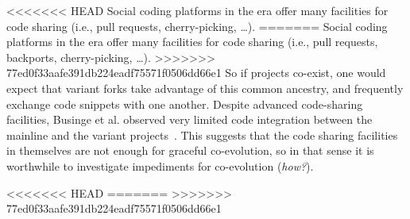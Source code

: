 <<<<<<< HEAD
Social coding platforms in the \gh era offer many facilities for code sharing (i.e., pull requests, cherry-picking, \ldots).
=======
Social coding platforms in the \gh era offer many facilities for code sharing (i.e., pull requests, backports, cherry-picking, \ldots).
>>>>>>> 77ed0f33aafe391db224eadf75571f0506dd66e1
So if projects co-exist, one would expect that variant forks take advantage of this common ancestry, and frequently exchange code snippets with one another.
Despite advanced code-sharing facilities, Businge et al. observed very limited code integration between the mainline and the variant projects~\cite{businge:emse:2021}.
This suggests that the code sharing facilities in themselves are not enough for graceful co-evolution, so in that sense it is worthwhile to investigate impediments for co-evolution (\textit{how?}).

<<<<<<< HEAD
=======
>>>>>>> 77ed0f33aafe391db224eadf75571f0506dd66e1

\newcommand*{\RQOne} [1] {Why do developers create and maintain variants on \gh?}
\newcommand*{\RQTwo} [1] {How do variant projects evolve with respect to the mainline?}


